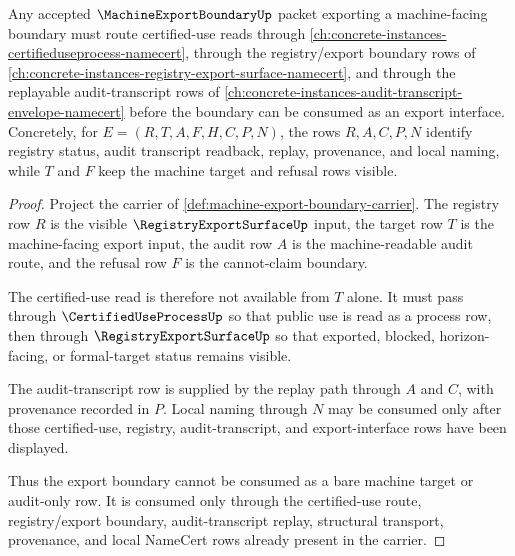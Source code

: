 \begin{theorem}
\label{thm:machine-export-boundary-certified-use-route}
Any accepted $\MachineExportBoundaryUp$ packet exporting a machine-facing boundary must route certified-use reads through \autoref{ch:concrete-instances-certifieduseprocess-namecert}, through the registry/export boundary rows of \autoref{ch:concrete-instances-registry-export-surface-namecert}, and through the replayable audit-transcript rows of \autoref{ch:concrete-instances-audit-transcript-envelope-namecert} before the boundary can be consumed as an export interface. Concretely, for $E=(R,T,A,F,H,C,P,N)$, the rows $R,A,C,P,N$ identify registry status, audit transcript readback, replay, provenance, and local naming, while $T$ and $F$ keep the machine target and refusal rows visible.
\end{theorem}
\begin{proof}
Project the carrier of \autoref{def:machine-export-boundary-carrier}. The registry row $R$ is the visible $\RegistryExportSurfaceUp$ input, the target row $T$ is the machine-facing export input, the audit row $A$ is the machine-readable audit route, and the refusal row $F$ is the cannot-claim boundary.

The certified-use read is therefore not available from $T$ alone. It must pass through $\CertifiedUseProcessUp$ so that public use is read as a process row, then through $\RegistryExportSurfaceUp$ so that exported, blocked, horizon-facing, or formal-target status remains visible.

The audit-transcript row is supplied by the replay path through $A$ and $C$, with provenance recorded in $P$. Local naming through $N$ may be consumed only after those certified-use, registry, audit-transcript, and export-interface rows have been displayed.

Thus the export boundary cannot be consumed as a bare machine target or audit-only row. It is consumed only through the certified-use route, registry/export boundary, audit-transcript replay, structural transport, provenance, and local NameCert rows already present in the carrier.
\end{proof}

